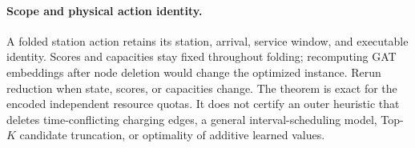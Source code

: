 \paragraph{Scope and physical action identity.}
A folded station action retains its station, arrival, service window,
and executable identity. Scores and capacities stay fixed throughout
folding; recomputing GAT embeddings after node deletion would change
the optimized instance. Rerun reduction when state, scores, or
capacities change. The theorem is exact for the encoded independent
resource quotas. It does not certify an outer heuristic that deletes
time-conflicting charging edges, a general interval-scheduling model,
Top-$K$ candidate truncation, or optimality of additive learned values.
